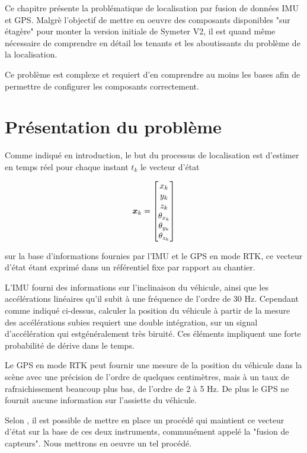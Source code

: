 \documentclass[12pt,a4paper]{report}
\begin{document}
Ce chapitre présente la problématique de localisation par fusion de données IMU et GPS. Malgrè l'objectif de mettre en oeuvre des composants disponibles "sur étagère" pour monter la version initiale de Symeter V2, il est quand même nécessaire de comprendre en détail les tenants et les aboutissants du problème de la localisation.

\para Ce problème est complexe et requiert d'en comprendre au moins les bases afin de permettre de configurer les composants correctement.

	\section{Présentation du problème}
	Comme indiqué en introduction, le but du processus de localisation est d'estimer en temps réel pour chaque instant $t_k$ le vecteur d'état 
	
	\begin{equation}	
	\boldsymbol{x}_k = \begin{bmatrix}
	x_k \\ y_k \\ z_k \\ \theta_{x_k} \\ \theta_{y_k} \\ \theta_{z_k}
	\end{bmatrix}
	\end{equation}
	\newline
	
	sur la base d'informations fournies par l'IMU et le GPS en mode RTK, ce vecteur d'état étant exprimé dans un référentiel fixe par rapport au chantier.
	
	\para L'IMU fourni des informations sur l'inclinaison du véhicule, ainsi que les accélérations linéaires qu'il subit à une fréquence de l'ordre de 30 Hz. Cependant comme indiqué ci-dessus, calculer la position du véhicule à partir de la mesure des accélérations subies requiert une double intégration, sur un signal d'accélération qui estgénéralement très biruité. Ces éléments impliquent une forte probabilité de dérive dans le temps.
	
	\para Le GPS en mode RTK peut fournir une mesure de la position du véhicule dans la scène avec une précision de l'ordre de quelques centimètres, mais à un taux de rafraichissement beaucoup plus bas, de l'ordre de 2 à 5 Hz. De plus le GPS ne fournit aucune information sur l'assiette du véhicule.
	
	\para Selon \cite{gustavsson_uav_2015}, il est possible de mettre en place un procédé qui maintient ce vecteur d'état sur la base de ces deux instruments, communément appelé la "fusion de capteurs". Nous mettrons en oeuvre un tel procédé.
	
\end{document}

